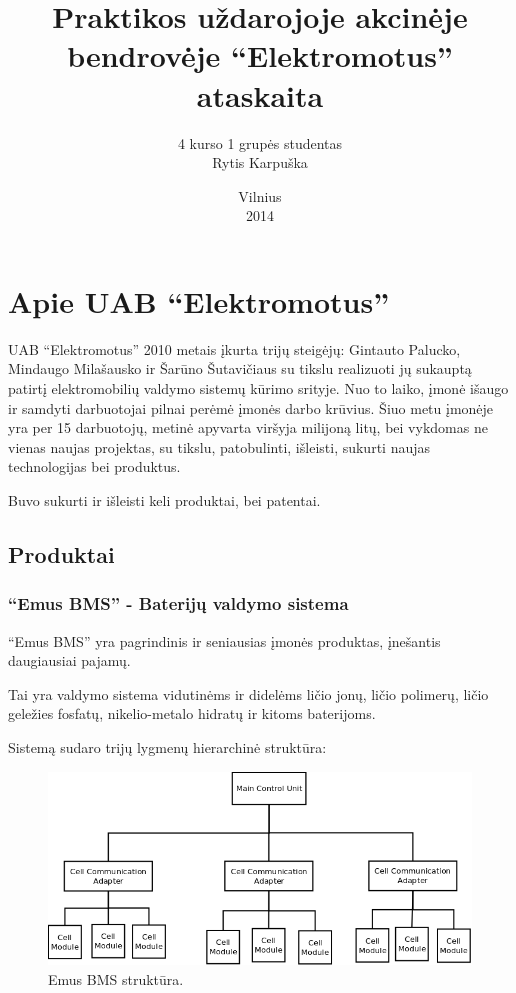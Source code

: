\documentclass[12pt, a4paper, lithuanian, final]{article}
\title{Praktikos uždarojoje akcinėje bendrovėje "`Elektromotus"' ataskaita}
\author{
    4 kurso 1 grupės studentas \\
    Rytis Karpuška
}
\date{Vilnius \\
	2014}
\begin{document}
\maketitle



\section{Apie UAB "`Elektromotus"'}

UAB "`Elektromotus"' 2010 metais įkurta trijų steigėjų: Gintauto Palucko, Mindaugo Milašausko ir Šarūno Šutavičiaus su tikslu realizuoti jų sukauptą patirtį elektromobilių valdymo sistemų kūrimo srityje.
Nuo to laiko, įmonė išaugo ir samdyti darbuotojai pilnai perėmė įmonės darbo krūvius.
Šiuo metu įmonėje yra per 15 darbuotojų, metinė apyvarta viršyja milijoną litų, bei vykdomas ne vienas naujas projektas, su tikslu, patobulinti, išleisti, sukurti naujas technologijas bei produktus.

Buvo sukurti ir išleisti keli produktai, bei patentai.


\subsection{Produktai}
\subsubsection{"`Emus BMS"' - Baterijų valdymo sistema}
"`Emus BMS"' yra pagrindinis ir seniausias įmonės produktas, įnešantis daugiausiai pajamų.

Tai yra valdymo sistema vidutinėms ir didelėms ličio jonų, ličio polimerų, ličio geležies fosfatų, nikelio-metalo hidratų ir kitoms baterijoms.

Sistemą sudaro trijų lygmenų hierarchinė struktūra:

\begin{figure}[H]
\begin{center}
\includegraphics[width=1\textwidth]{img/bms_desc.png}
\caption{Emus BMS struktūra.}
\end{center}
\end{figure}
\end{document}
